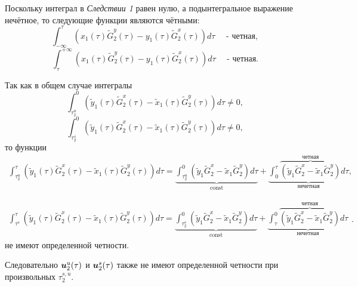 Поскольку интеграл в \textit{Следствии 1} равен нулю, а подынтегральное выражение нечётное, то следующие функции являются чётными:
$$\int_{-\infty}^{\tau} \left( x_1(\tau) \tilde G_2^y(\tau) - y_1(\tau) \tilde G_2^x(\tau) \right) d \tau \quad \text{ - четная},$$
$$\int_{\tau}^{+\infty} \left( x_1(\tau) \tilde G_2^y(\tau) - y_1(\tau) \tilde G_2^x(\tau) \right) d \tau \quad \text{ - четная}.$$

Так как в общем случае интегралы
$$\int_{\tau^u_2}^{0} \left( \tilde y_1(\tau) \tilde G_2^x(\tau) - \tilde x_1(\tau) \tilde G_2^y(\tau) \right) d \tau \ne 0,$$
$$\int_{\tau^s_2}^{0} \left( \tilde y_1(\tau) \tilde G_2^x(\tau) - \tilde x_1(\tau) \tilde G_2^y(\tau) \right) d \tau \ne 0,$$
то функции 
\begin{equation*}
\begin{aligned}
\int_{\tau^u_2}^{\tau} \left( \tilde y_1(\tau) \tilde G_2^x(\tau) - \tilde x_1(\tau) \tilde G_2^y(\tau) \right) d \tau = \underbrace{\int_{\tau^u_2}^{0} \left( \tilde y_1 \tilde G_2^x - \tilde x_1 \tilde G_2^y \right) d \tau}_{\text{const}} + \underbrace{\int_{0}^{\tau} \overbrace{ \left( \tilde y_1 \tilde G_2^x - \tilde x_1 \tilde G_2^y \right)}^{\text{четная}} d \tau}_{\text{нечетная}},
\end{aligned}
\end{equation*}

\begin{equation*}
\begin{aligned}
\int_{\tau^s}^{\tau} \left( \tilde y_1(\tau) \tilde G_2^x(\tau) - \tilde x_1(\tau) \tilde G_2^y(\tau) \right) d \tau = \underbrace{\int_{\tau^s_2}^{0} \left( \tilde y_1 \tilde G_2^x - \tilde x_1 \tilde G_2^y \right) d \tau}_{\text{const}} + \underbrace{\int_{\tau}^{0} \overbrace{ \left( \tilde y_1 \tilde G_2^x - \tilde x_1 \tilde G_2^y \right)}^{\text{четная}} d \tau}_{\text{нечетная}}
\end{aligned}.
\end{equation*}
не имеют определенной четности.

Следовательно $\boldsymbol{u}_2^u(\tau)$ и $\boldsymbol{u}_2^s(\tau)$ также не имеют определенной четности при произвольных $\tau_2^{s,u}$. 

